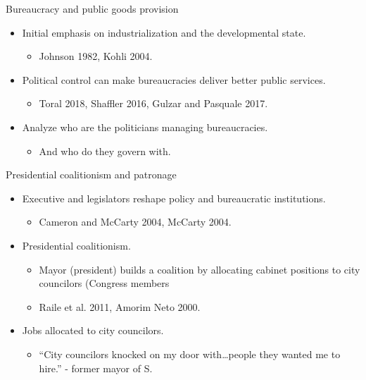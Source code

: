 \documentclass[ignorenonframetext,]{beamer}
\providecommand{\tightlist}{%
  \setlength{\itemsep}{0pt}\setlength{\parskip}{0pt}}
\newcommand{\source}{\footnotesize\textcolor{black!25}}
\begin{document}
\begin{frame}{Bureaucracy and public goods provision}
\protect\hypertarget{bureaucracy-and-public-goods-provision}{}

\begin{itemize}
\tightlist
\item
  Initial emphasis on industrialization and the developmental state.

  \begin{itemize}
  \item
    \source{Johnson 1982, Kohli 2004.}
  \end{itemize}
\item
  Political control can make bureaucracies deliver better public
  services.

  \begin{itemize}
  \item
    \source{Toral 2018, Shaffler 2016, Gulzar and Pasquale 2017.}
  \end{itemize}
\item
  Analyze who are the politicians managing bureaucracies.

  \begin{itemize}
  \tightlist
  \item
    And who do they govern with.
  \end{itemize}
\end{itemize}

\end{frame}

\begin{frame}{Presidential coalitionism and patronage}
\protect\hypertarget{presidential-coalitionism-and-patronage}{}

\begin{itemize}
\tightlist
\item
  Executive and legislators reshape policy and bureaucratic
  institutions.

  \begin{itemize}
  \item
    \source{Cameron and McCarty 2004, McCarty 2004.}
  \end{itemize}
\item
  Presidential coalitionism.

  \begin{itemize}
  \item
    Mayor (president) builds a coalition by allocating cabinet positions
    to city councilors (Congress members
  \item
    \source{Raile et al. 2011, Amorim Neto 2000.}
  \end{itemize}
\item
  Jobs allocated to city councilors.

  \begin{itemize}
  \tightlist
  \item
    ``City councilors knocked on my door with\ldots{}people they wanted
    me to hire.'' \source{- former mayor of S.}
  \end{itemize}
\end{itemize}

\end{frame}
\end{document}
